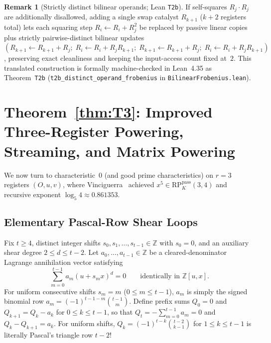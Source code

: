 \documentclass[11pt,reqno]{amsart}
\theoremstyle{definition}
\newtheorem{remark}[theorem]{Remark}
\newcommand{\Z}{\mathbb{Z}}
\newcommand{\RP}{\mathrm{RP}}
\newcommand{\pass}{\mathrm{pass}}
\begin{document}
\begin{remark}[Strictly distinct bilinear operands; Lean \texttt{T2b}]
If self-squares $R_j \cdot R_j$ are additionally disallowed, adding a single swap catalyst $R_{k+1}$ ($k + 2$ registers total) lets each squaring step $R_i \leftarrow R_i + R_j^2$ be replaced by passive linear copies plus strictly pairwise-distinct bilinear updates $(R_{k+1} \leftarrow R_{k+1} + R_j;\; R_i \leftarrow R_i + R_j R_{k+1};\; R_{k+1} \leftarrow R_{k+1} + R_j;\; R_i \leftarrow R_i + R_j R_{k+1})$, preserving exact cleanliness and keeping the input-access count fixed at~$2$.
This translated construction is formally machine-checked in Lean~4.35 as Theorem~\texttt{T2b} (\texttt{t2b\_distinct\_operand\_frobenius} in \texttt{BilinearFrobenius.lean}).
\end{remark}

\section{Theorem~\ref{thm:T3}: Improved Three-Register Powering, Streaming, and Matrix Powering}
\label{sec:T3}

We now turn to characteristic~$0$ (and good prime characteristics) on $r = 3$ registers $(O, u, v)$, where Vinciguerra~\cite[Theorem~2.3]{Vinciguerra2026} achieved $x^5 \in \RP_K^{\pass}(3, 4)$ and recursive exponent $\log_5 4 \approx 0.861353$.

\subsection{Elementary Pascal-Row Shear Loops}

Fix $t \ge 4$, distinct integer shifts $s_0, s_1, \dots, s_{t-1} \in \Z$ with $s_0 = 0$, and an auxiliary shear degree $2 \le d \le t - 2$.
Let $a_0, \dots, a_{t-1} \in \Z$ be a cleared-denominator Lagrange annihilation vector satisfying
\[
  \sum_{m=0}^{t-1} a_m (u + s_m x)^d = 0 \qquad \text{identically in } \Z[u, x].
\]
For uniform consecutive shifts $s_m = m$ ($0 \le m \le t - 1$), $a_m$ is simply the signed binomial row $a_m = (-1)^{t - 1 - m} \binom{t-1}{m}$.
Define prefix sums $Q_0 = 0$ and $Q_{k+1} = Q_k - a_k$ for $0 \le k \le t - 1$, so that $Q_t = -\sum_{m=0}^{t-1} a_m = 0$ and $Q_k - Q_{k+1} = a_k$.
For uniform shifts, $Q_k = (-1)^{t-k}\binom{t-2}{k-1}$ for $1 \le k \le t - 1$ is literally Pascal's triangle row $t - 2$!
\end{document}
